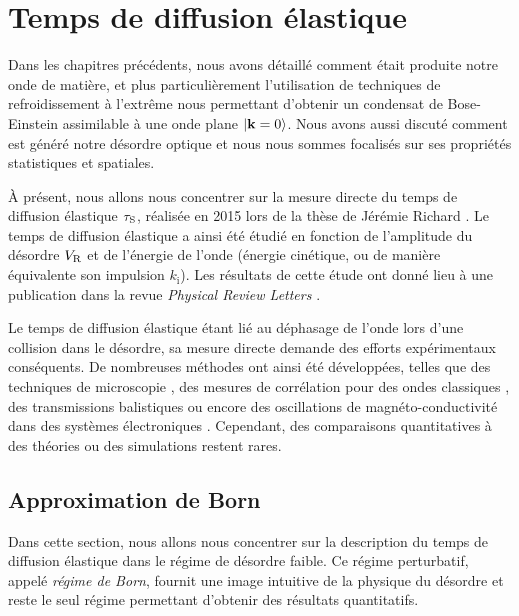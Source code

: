 \chapter{Temps de diffusion élastique}
\label{ch:TauS_PRL}

Dans les chapitres précédents, nous avons détaillé comment était produite notre onde de matière, et plus particulièrement l'utilisation de techniques de refroidissement à l'extrême nous permettant d'obtenir un condensat de Bose-Einstein assimilable à une onde plane $\left| \mathbf{k}=0 \right\rangle$. Nous avons aussi discuté comment est généré notre désordre optique et nous nous sommes focalisés sur ses propriétés statistiques et spatiales.

À présent, nous allons nous concentrer sur la mesure directe du temps de diffusion élastique $\tau_{\mathrm{S}}$, réalisée en 2015 lors de la thèse de Jérémie Richard \citep{richard2015propagation}. Le temps de diffusion élastique a ainsi été étudié en fonction de l'amplitude du désordre $V_{\mathrm{R}}$ et de l'énergie de l'onde (énergie cinétique, ou de manière équivalente son impulsion $k_{\mathrm{i}}$). Les résultats de cette étude ont donné lieu à une publication dans la revue \emph{Physical Review Letters} \citep{richard2019elastic}.

Le temps de diffusion élastique étant lié au déphasage de l'onde lors d'une collision dans le désordre, sa mesure directe demande des efforts expérimentaux conséquents. De nombreuses méthodes ont ainsi été développées, telles que des techniques de microscopie \citep{jacques2012reflectance}\citep{martin2016determination}, des mesures de corrélation pour des ondes classiques \citep{sebbah2002spatial}\citep{hildebrand2014observation}\citep{obermann2014measuring}, des transmissions balistiques \citep{page1996group}\citep{savo2017observation} ou encore des oscillations de magnéto-conductivité dans des systèmes électroniques \citep{niederer1974magneto}\citep{bockelmann1990single}\citep{monteverde2010transport}. Cependant, des comparaisons quantitatives à des théories ou des simulations restent rares.

\section{Approximation de Born}
Dans cette section, nous allons nous concentrer sur la description du temps de diffusion élastique dans le régime de désordre faible. Ce régime perturbatif, appelé \emph{régime de Born}, fournit une image intuitive de la physique du désordre et reste le seul régime permettant d'obtenir des résultats quantitatifs.

